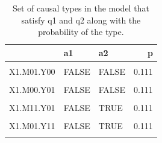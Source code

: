 \documentclass[
  12pt,
]{book}
\newenvironment{Shaded}{\begin{snugshade}}{\end{snugshade}}
\newcommand{\AttributeTok}[1]{\textcolor[rgb]{0.77,0.63,0.00}{#1}}
\newcommand{\FunctionTok}[1]{\textcolor[rgb]{0.00,0.00,0.00}{#1}}
\newcommand{\NormalTok}[1]{#1}
\newcommand{\OtherTok}[1]{\textcolor[rgb]{0.56,0.35,0.01}{#1}}
\newcommand{\SpecialCharTok}[1]{\textcolor[rgb]{0.00,0.00,0.00}{#1}}
\newcommand{\StringTok}[1]{\textcolor[rgb]{0.31,0.60,0.02}{#1}}
\begin{document}
\begin{Shaded}
\end{Shaded}

\begin{table}

\caption{\label{tab:ch4q1q2}Set of causal types in the model that satisfy q1 and q2 along with the probability of the type.}
\centering
\begin{tabular}[t]{lllr}
\toprule
  & a1 & a2 & p\\
\midrule
\cellcolor{gray!6}{X1.M00.Y00} & \cellcolor{gray!6}{FALSE} & \cellcolor{gray!6}{FALSE} & \cellcolor{gray!6}{0.111}\\
X1.M01.Y00 & FALSE & FALSE & 0.111\\
\cellcolor{gray!6}{X1.M11.Y00} & \cellcolor{gray!6}{FALSE} & \cellcolor{gray!6}{FALSE} & \cellcolor{gray!6}{0.111}\\
X1.M00.Y01 & FALSE & FALSE & 0.111\\
\cellcolor{gray!6}{X1.M01.Y01} & \cellcolor{gray!6}{TRUE} & \cellcolor{gray!6}{TRUE} & \cellcolor{gray!6}{0.111}\\
\addlinespace
X1.M11.Y01 & FALSE & TRUE & 0.111\\
\cellcolor{gray!6}{X1.M00.Y11} & \cellcolor{gray!6}{FALSE} & \cellcolor{gray!6}{TRUE} & \cellcolor{gray!6}{0.111}\\
X1.M01.Y11 & FALSE & TRUE & 0.111\\
\cellcolor{gray!6}{X1.M11.Y11} & \cellcolor{gray!6}{FALSE} & \cellcolor{gray!6}{TRUE} & \cellcolor{gray!6}{0.111}\\
\bottomrule
\end{tabular}
\end{table}
\end{document}
